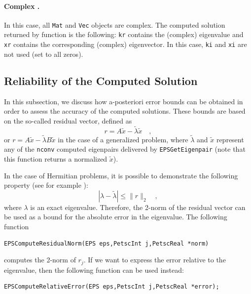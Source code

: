 \paragraph{Complex \slepc.} In this case, all \texttt{Mat} and \texttt{Vec} objects are complex. The computed solution returned by function  is the following: \texttt{kr} contains the (complex) eigenvalue and \texttt{xr} contains the corresponding (complex) eigenvector. In this case, \texttt{ki} and \texttt{xi} are not used (set to all zeros).

\subsection{Reliability of the Computed Solution}

	In this subsection, we discuss how a-posteriori error bounds can be obtained in order to assess the accuracy of the computed solutions. These bounds are based on the so-called residual vector, defined as
\begin{equation}
r=A\tilde{x}-\tilde{\lambda}\tilde{x}\quad,
\end{equation}
or $r=A\tilde{x}-\tilde{\lambda}B\tilde{x}$ in the case of a generalized problem, where $\tilde{\lambda}$ and $\tilde{x}$ represent any of the \texttt{nconv} computed eigenpairs delivered by \texttt{EPSGetEigenpair} (note that this function returns a normalized $\tilde{x}$). 

	In the case of Hermitian problems, it is possible to demonstrate the following property (see for example \citep[ch. 3]{Saad:1992:NML}):
\begin{equation}\label{eq:reserr}
|\lambda-\tilde{\lambda}|\leq \|r\|_2\quad,
\end{equation}
where $\lambda$ is an exact eigenvalue. Therefore, the 2-norm of the residual vector can be used as a bound for the absolute error in the eigenvalue. The following \slepc function 
	\begin{Verbatim}[fontsize=\small]
	EPSComputeResidualNorm(EPS eps,PetscInt j,PetscReal *norm)
	\end{Verbatim}
computes the 2-norm of $r_j$. If we want to express the error relative to the eigenvalue, then the following function can be used instead:
	\begin{Verbatim}[fontsize=\small]
	EPSComputeRelativeError(EPS eps,PetscInt j,PetscReal *error);
	\end{Verbatim}

